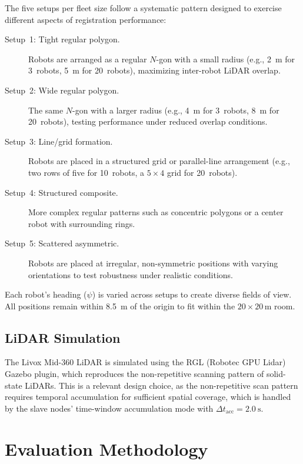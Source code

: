 The five setups per fleet size follow a systematic pattern
designed to exercise different aspects of registration performance:

\begin{description}
    \item[Setup~1: Tight regular polygon.]
        Robots are arranged as a regular $N$-gon with a small
        radius (e.g., \SI{2}{\metre} for 3~robots,
        \SI{5}{\metre} for 20~robots), maximizing inter-robot
        LiDAR overlap.
    \item[Setup~2: Wide regular polygon.]
        The same $N$-gon with a larger radius (e.g., \SI{4}{\metre}
        for 3~robots, \SI{8}{\metre} for 20~robots), testing
        performance under reduced overlap conditions.
    \item[Setup~3: Line/grid formation.]
        Robots are placed in a structured grid or parallel-line
        arrangement (e.g., two rows of five for 10~robots,
        a $5 \times 4$ grid for 20~robots).
    \item[Setup~4: Structured composite.]
        More complex regular patterns such as concentric polygons
        or a center robot with surrounding rings.
    \item[Setup~5: Scattered asymmetric.]
        Robots are placed at irregular, non-symmetric positions
        with varying orientations to test robustness under
        realistic conditions.
\end{description}

Each robot's heading ($\psi$) is varied across setups to create
diverse fields of view.
All positions remain within \SI{8.5}{\metre} of the origin to
fit within the $20 \times 20$\,m room.

\subsection{LiDAR Simulation}

The Livox Mid-360 LiDAR is simulated using the RGL (Robotec GPU
Lidar) Gazebo plugin, which reproduces the non-repetitive scanning
pattern of solid-state LiDARs.
This is a relevant design choice, as the non-repetitive scan pattern
requires temporal accumulation for sufficient spatial coverage, which
is handled by the slave nodes' time-window accumulation mode with
$\Delta t_\mathrm{acc} = \SI{2.0}{\second}$.

\section{Evaluation Methodology}
\label{sec:evaluation_methodology}

